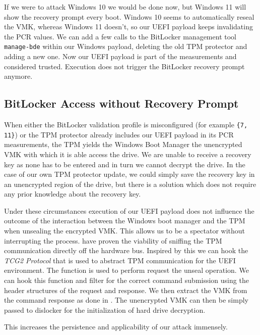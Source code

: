 

If we were to attack Windows 10 we would be done now, but Windows 11 will show the recovery prompt every boot.
Windows 10 seems to automatically reseal the \ac{VMK}, whereas Windows 11 doesn't, so our \ac{UEFI} payload keeps invalidating the \ac{PCR} values.
We can add a few calls to the BitLocker management tool \lstinline{manage-bde} \cite{microsoft-bitlocker-manage-bde} within our Windows payload, deleting the old \ac{TPM} protector and adding a new one.
Now our \ac{UEFI} payload is part of the measurements and considered trusted.
Execution does not trigger the BitLocker recovery prompt anymore.

\subsection{BitLocker Access without Recovery Prompt}
\label{sec:attacks:bitlocker:bitlocker-access-without-recovery-prompt}

When either the BitLocker validation profile is misconfigured (for example \lstinline|{7, 11}|) or the \ac{TPM} protector already includes our \ac{UEFI} payload in its \ac{PCR} measurements, the \ac{TPM} yields the Windows Boot Manager the unencrypted \ac{VMK} with which it is able access the drive.
We are unable to receive a recovery key as none has to be entered and in turn we cannot decrypt the drive.
In the case of our own \ac{TPM} protector update, we could simply save the recovery key in an unencrypted region of the drive, but there is a solution which does not require any prior knowledge about the recovery key.

Under these circumstances execution of our \ac{UEFI} payload does not influence the outcome of the interaction between the Windows boot manager and the \ac{TPM} when unsealing the encrypted \ac{VMK}.
This allows us to be a spectator without interrupting the process.
\cite{tpm-spi-sniffing, tpm-lpc-sniffing} have proven the viability of sniffing the \ac{TPM} communication directly off the hardware bus.
Inspired by this we can hook the \emph{\ac{TCG}2 Protocol} that is used to abstract \ac{TPM} communication for the \ac{UEFI} environment.
The function  is used to perform request the unseal operation.
We can hook this function and filter for the correct command submission using the header structures of the request and response.
We then extract the \ac{VMK} from the command response as done in \cite{tpm-lpc-sniffing}.
The unencrypted \ac{VMK} can then be simply passed to dislocker for the initialization of hard drive decryption.

This increases the persistence and applicability of our attack immensely.

\clearpage
